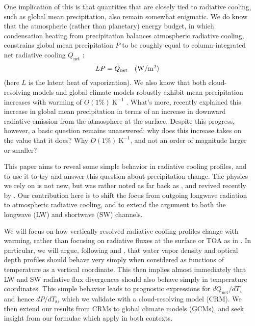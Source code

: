 \documentclass[10pt]{article}
\newcommand{\beqn}{\begin{equation}}
\newcommand{\eeqn}{\end{equation}}
\newcommand{\Qnet}{\ensuremath{Q_\mathrm{net}}}
\newcommand{\Wmsq}{\ensuremath{\mathrm{W/m^2}}}
\newcommand{\Ts}{\ensuremath{T_\mathrm{s}}}
\newcommand{\Kinverse}{\ensuremath{\mathrm{K^{-1}}}}
\begin{document}

One implication of this is that quantities that are closely tied to radiative cooling, such as global mean precipitation, also remain somewhat enigmatic. We do know that the atmospheric (rather than planetary) energy budget, in which condensation heating from precipitation balances atmospheric radiative cooling, constrains global mean precipitation $P$ to be roughly equal to column-integrated net radiative cooling $\Qnet$ \citep{ogorman2012,allen2002}:
\beqn
	LP = \Qnet \quad \mbox{(\Wmsq)} \label{rad_precip_constraint}
\eeqn
(here $L$ is the latent heat of vaporization). We also know that both cloud-resolving models and global climate models robustly exhibit  mean precipitation increases with warming of $O(1\%)\ \Kinverse$  \citep{stephens2008, lambert2008, held2006}. What's more, \cite{pendergrass2014} recently explained this increase in global mean precipitation in terms of an increase in downward radiative emission from the atmosphere at the surface. Despite this progress, however, a basic question remains unanswered: why does this increase takes on the value that it does? Why $O(1\%)\ \Kinverse$, and not an order of magnitude larger or smaller?

This paper aims to reveal some simple behavior in radiative cooling profiles, and to use it to try and answer this question about precipitation change. The physics we rely on is not new, but was rather noted as far back as \cite{simpson1928}, and revived recently by \cite{ingram2010}. Our contribution here is to shift the focus from outgoing longwave radiation to atmospheric radiative cooling, and to extend the argument to both the longwave (LW) and shortwave (SW) channels. 

We will  focus on how vertically-resolved radiative cooling profiles change with warming, rather than focusing on radiative fluxes at the surface or TOA as in \cite{pendergrass2014}. In particular, we will argue, following \cite{simpson1928} and \cite{ingram2010}, that water vapor density and optical depth profiles should behave very simply when considered as functions of temperature as a vertical coordinate. This then implies almost immediately that LW and SW radiative flux divergences should also behave simply in temperature coordinates. This simple behavior leads to prognostic expressions for $d\Qnet/d\Ts$ and hence $dP/d\Ts$, which we validate with a cloud-resolving model (CRM). We then extend our results from CRMs to global climate models (GCMs),  and seek insight from our formulae which apply in both contexts. 
\end{document}

